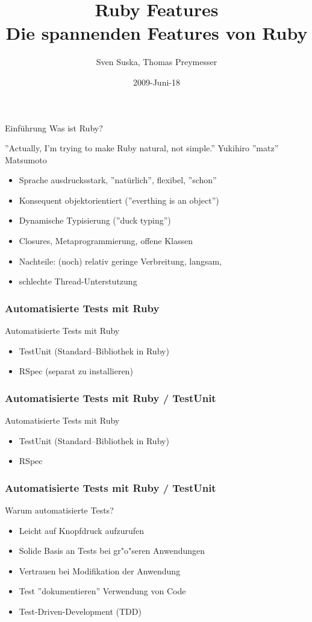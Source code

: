 \documentclass{beamer}
\title[Ruby]{Ruby Features\\Die spannenden Features von Ruby}
\author{Sven Suska, Thomas Preymesser}
\date{2009-Juni-18}
\begin{document}
\lstset{language=Ruby}
\lstset{basicstyle=\small,numbers=left, numberstyle=\tiny, numbersep=5pt}
\begin{frame}
\titlepage
\end{frame}


\begin{frame}{Einführung}
Was ist Ruby?

''Actually, I'm trying to make Ruby natural, not simple.''
Yukihiro ''matz'' Matsumoto


\begin{itemize}
\pause \item Sprache ausdrucksstark, ''natürlich'', flexibel, ''schon''
\pause \item Konsequent objektorientiert (''everthing is an object'')
\pause \item Dynamische Typisierung (''duck typing'')
\pause \item Closures, Metaprogrammierung, offene Klassen
\pause \item Nachteile: (noch) relativ geringe Verbreitung, langsam, 
\pause \item schlechte Thread-Unterstutzung
\end{itemize}
\end{frame}





\begin{frame}
  \frametitle{Automatisierte Tests mit Ruby}
  Automatisierte Tests mit Ruby
  \begin{itemize}
    \item<1-> TestUnit (Standard--Bibliothek in Ruby)
    \item<2-> RSpec (separat zu installieren)
  \end{itemize}
\end{frame}

\begin{frame}
  \frametitle{Automatisierte Tests mit Ruby / TestUnit}
  Automatisierte Tests mit Ruby
  \begin{itemize}
    \item TestUnit (Standard--Bibliothek in Ruby)
    \pause
    \item RSpec 
  \end{itemize}
\end{frame}

\begin{frame}

  \frametitle{Automatisierte Tests mit Ruby / TestUnit}
  Warum automatisierte Tests?
  \begin{itemize}
    \item Leicht auf Knopfdruck aufzurufen
    \item Solide Basis an Tests bei gr"o"seren Anwendungen
    \item Vertrauen bei Modifikation der Anwendung
    \item Test ''dokumentieren'' Verwendung von Code
    \item Test-Driven-Development (TDD)
  \end{itemize}
\end{frame}
\end{document}
